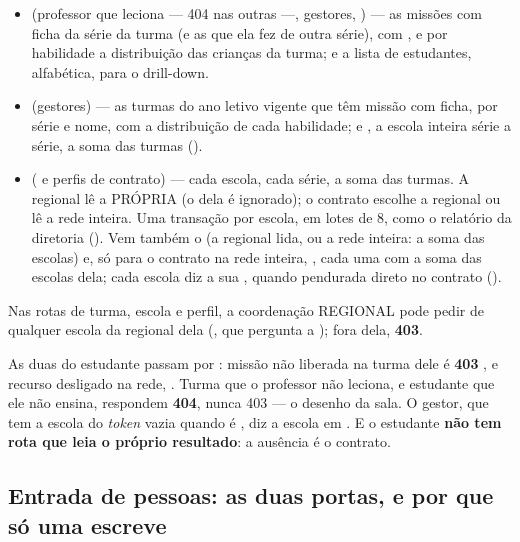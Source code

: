 \begin{itemize}
  \item {} (professor que
    leciona --- 404 nas outras ---, gestores, ) --- as missões com
    ficha da série da turma (e as que ela fez de outra série), com
    , e por habilidade a distribuição das crianças da turma; e a
    lista de estudantes, alfabética, para o drill-down.
  \item {} (gestores) --- as turmas do
    ano letivo vigente que têm missão com ficha, por série e nome, com a
    distribuição de cada habilidade; e , a escola inteira série a
    série, a soma das turmas ().
  \item {} ( e
    perfis de contrato) --- cada escola, cada série, a soma das turmas. A
    regional lê a PRÓPRIA (o  dela é ignorado); o contrato
    escolhe a regional ou lê a rede inteira. Uma transação por escola, em
    lotes de 8, como o relatório da diretoria (). Vem também o
     (a regional lida, ou a rede inteira: a soma das escolas) e, só
    para o contrato na rede inteira, , cada uma com a soma das
    escolas dela; cada escola diz a sua ,  quando
    pendurada direto no contrato ().
\end{itemize}

Nas rotas de turma, escola e perfil, a coordenação REGIONAL pode pedir
 de qualquer escola da regional dela (,
que pergunta a ); fora dela, \textbf{403}.

As duas do estudante passam por : missão não liberada
na turma dele é \textbf{403} , e recurso desligado na
rede, . Turma que o professor não leciona, e estudante
que ele não ensina, respondem \textbf{404}, nunca 403 --- o desenho da sala. O
gestor, que tem a escola do \emph{token} vazia quando é
, diz a escola em . E o estudante
\textbf{não tem rota que leia o próprio resultado}: a ausência é o contrato.

\subsection{Entrada de pessoas: as duas portas, e por que só uma escreve}

